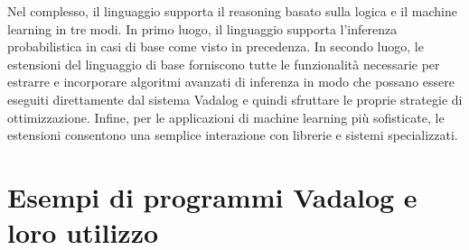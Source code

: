 Nel complesso, il linguaggio supporta il reasoning basato sulla logica e il machine learning in tre modi. In primo luogo, il linguaggio supporta l'inferenza probabilistica in casi di base come visto in precedenza. \newline
In secondo luogo, le estensioni del linguaggio di base forniscono tutte le funzionalità necessarie per estrarre e incorporare algoritmi avanzati di inferenza in modo che possano essere eseguiti direttamente dal sistema Vadalog e quindi sfruttare le proprie strategie di ottimizzazione. \newline
Infine, per le applicazioni di machine learning più sofisticate, le estensioni consentono una semplice interazione con librerie e sistemi specializzati.

\section{Esempi di programmi Vadalog e loro utilizzo}

